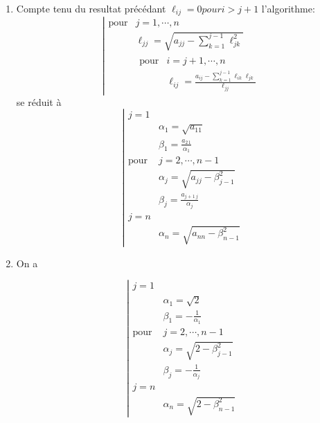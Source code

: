 \documentclass[a4paper]{article}
\begin{document}
\begin{enumerate}
\begin{enumerate}
\[\begin{array}{cccccc}
0&\cdots& &0&\ell_{n\,n-1}&\ell_{nn}
\end{array}\right)
\]
Pour $j=1$
\[\forall i\geq 3\quad \ell_{i1}=\frac {a_{i1}}{\ell_{11}}=\frac{0}{\ell_{11}}=0\]
Supposons que $\forall k\leq j-1\quad \forall i>k+1\quad \ell_{ik}=0$ on a alors
\[\ell_{ij}=\frac{a_{ij}-\sum_{k=1}^{j-1}\ell_{ik}\ell_{jk}}{\ell_{jj}}=\frac{0-\sum_{k=1}^{j-1}0\times \ell_{jk}}{\ell_{jj}}=0\]
\item Compte tenu du resultat précédant $\ell_{ij}=0 pour i>j+1$ l'algorithme:
\[\left|\begin{array}{cl}
\mbox{pour} & j=1,\cdots ,n\\
             & \ell_{jj}=\sqrt{a_{jj}-\sum_{k=1}^{j-1}\ell_{jk}^2}\\
             &\begin{array}{cl}
\mbox{pour} & i=j+1,\cdots ,n\\
             & \ell_{ij}=\frac{a_{ij}-\sum_{k=1}^{j-1}\ell_{ik}\ell_{jk}}{\ell_{jj}}
\end{array}
\end{array}\right.
\]
se réduit à
\[\left|\begin{array}{cl}
j=1 & \\
             & \alpha_{1}=\sqrt{a_{11}}\\
             & \beta_{1}=\frac{a_{2\,1}}{\alpha_{1}}\\
\mbox{pour} & j=2,\cdots ,n-1\\
             & \alpha_{j}=\sqrt{a_{jj}-\beta_{j-1}^2}\\
             & \beta_{j}=\frac{a_{j+1\,j}}{\alpha_{j}}\\
 j=n &\\
             & \alpha_{n}=\sqrt{a_{nn}-\beta_{n-1}^2}             

\end{array}\right.
\]

\item On a

\[\left|\begin{array}{cl}
j=1 & \\
             & \alpha_{1}=\sqrt{2}\\
             & \beta_{1}=-\frac 1{\alpha_{1}}\\
\mbox{pour} & j=2,\cdots ,n-1\\
             & \alpha_{j}=\sqrt{2-\beta_{j-1}^2}\\
             & \beta_{j}=-\frac 1{\alpha_{j}}\\
 j=n &\\
             & \alpha_{n}=\sqrt{2-\beta_{n-1}^2}             


\end{array}\]
\end{enumerate}
\end{enumerate}
\end{document}
